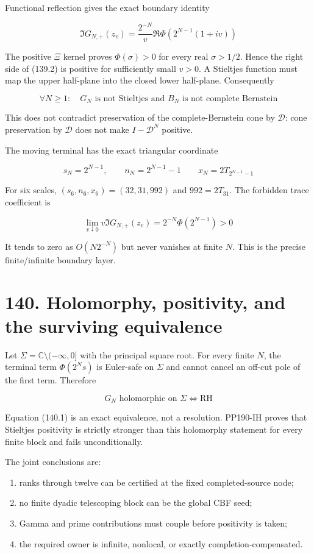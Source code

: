 \documentclass[
  11pt,
]{book}
\providecommand{\tightlist}{%
  \setlength{\itemsep}{0pt}\setlength{\parskip}{0pt}}
\begin{document}
Functional reflection gives the exact boundary identity

\[
\boxed{
\Im G_{N,+}(z_v)
=\frac{2^{-N}}v
\Re\Phi\!\left(2^{N-1}(1+iv)\right)}
\tag{139.2}
\]

The positive \(\Xi\) kernel proves \(\Phi(\sigma)>0\) for every real
\(\sigma>1/2\). Hence the right side of (139.2) is positive for
sufficiently small \(v>0\). A Stieltjes function must map the upper
half-plane into the closed lower half-plane. Consequently

\[
\boxed{
\forall N\ge1:\quad G_N\text{ is not Stieltjes and }B_N
\text{ is not complete Bernstein}}
\tag{139.3}
\]

This does not contradict preservation of the complete-Bernstein cone by
\(\mathscr D\): cone preservation by \(\mathscr D\) does not make
\(I-\mathscr D^N\) positive.

The moving terminal has the exact triangular coordinate

\[
s_N=2^{N-1},\qquad n_N=2^{N-1}-1
\qquad x_N=2T_{2^{N-1}-1}
\tag{139.4}
\]

For six scales, \((s_6,n_6,x_6)=(32,31,992)\) and \(992=2T_{31}\). The
forbidden trace coefficient is

\[
\lim_{v\downarrow0}v\Im G_{N,+}(z_v)
=2^{-N}\Phi(2^{N-1})>0
\tag{139.5}
\]

It tends to zero as \(O(N2^{-N})\) but never vanishes at finite \(N\).
This is the precise finite/infinite boundary layer.

\section{140. Holomorphy, positivity, and the surviving
equivalence}\label{holomorphy-positivity-and-the-surviving-equivalence}

Let \(\Sigma=\mathbb C\setminus(-\infty,0]\) with the principal square
root. For every finite \(N\), the terminal term \(\Phi(2^Ns)\) is
Euler-safe on \(\Sigma\) and cannot cancel an off-cut pole of the first
term. Therefore

\[
\boxed{G_N\text{ holomorphic on }\Sigma\iff\mathrm{RH}}
\tag{140.1}
\]

Equation (140.1) is an exact equivalence, not a resolution. PP190-IH
proves that Stieltjes positivity is strictly stronger than this
holomorphy statement for every finite block and fails unconditionally.

The joint conclusions are:

\begin{enumerate}
\def\labelenumi{\arabic{enumi}.}
\tightlist
\item
  ranks through twelve can be certified at the fixed completed-source
  node;
\item
  no finite dyadic telescoping block can be the global CBF seed;
\item
  Gamma and prime contributions must couple before positivity is taken;
\item
  the required owner is infinite, nonlocal, or exactly
  completion-compensated.
\end{enumerate}
\end{document}

